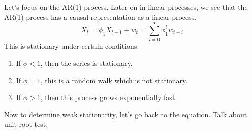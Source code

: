 \documentclass{article}
\begin{document}
    \begin{example}[AR(1) Processes]
      Let's focus on the AR(1) process. Later on in linear processes, we see that the AR(1) process has a causal representation as a linear process. 
      \begin{equation}
        X_t = \phi_1 X_{t-1} + w_t = \sum_{i=0}^\infty \phi_1^i w_{t-i}
      \end{equation}
      This is stationary under certain conditions. 
      \begin{enumerate}
        \item If $\phi < 1$, then the series is stationary. 
        \item If $\phi = 1$, this is a random walk which is not stationary. 
        \item If $\phi > 1$, then this process grows exponentially fast. 
      \end{enumerate}
    \end{example}

    Now to determine weak stationarity, let's go back to the equation. Talk about unit root test. 
\end{document}

